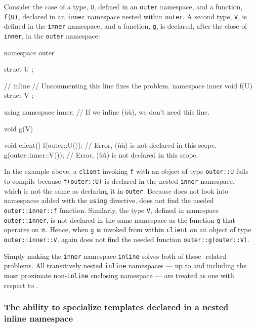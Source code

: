 Consider the case of a type, \lstinline!U!, defined in an \lstinline!outer!
namespace, and a function, \lstinline!f(U)!, declared in an \lstinline!inner!
namespace nested within \lstinline!outer!. A second type, \lstinline!V!, is
defined in the \lstinline!inner! namespace, and a function, \lstinline!g!, is
declared, after the close of \lstinline!inner!, in the \lstinline!outer!
namespace:

\begin{emcppslisting}
namespace outer
{
    struct U { };

    // inline               // Uncommenting this line fixes the problem.
    namespace inner
    {
         void f(U) { }
         struct V { };
    }

    using namespace inner;  // If we inline (ù{}ù), we don't need this line.

    void g(V) { }
}

void client()
{
    f(outer::U());         // Error, (ù{}ù) is not declared in this scope.
    g(outer::inner::V());  // Error, (ù{}ù) is not declared in this scope.
}
\end{emcppslisting}
    
\noindent In the example above, a \lstinline!client! invoking \lstinline!f! with an
object of type \lstinline!outer::U! fails to compile because
\lstinline!f(outer::U)! is declared in the nested \lstinline!inner! namespace,
which is not the same as declaring it in \lstinline!outer!. Because
 does not look into namespaces added with the \lstinline!using!
directive,  does not find the needed
\lstinline!outer::inner::f! function. Similarly, the type \lstinline!V!,
defined in namespace \lstinline!outer::inner!, is not declared in the same
namespace as the function \lstinline!g! that operates on it. Hence, when
\lstinline!g! is invoked from within \lstinline!client! on an object of type
\lstinline!outer::inner::V!,  again does not find the needed
function \lstinline!outer::g(outer::V)!.

Simply making the \lstinline!inner! namespace \lstinline!inline! solves both
of these -related problems. All transitively nested
\lstinline!inline! namespaces --- up to and including the most proximate
non-\lstinline!inline! enclosing namespace --- are treated as one with
respect to .

\subsubsection[The ability to specialize templates declared in a nested \lstinline!inline! namespace]{The ability to specialize templates declared in a nested {\SubsubsecCode inline} namespace}\label{the-ability-to-specialize-templates-declared-in-a-nested-inline-namespace}

